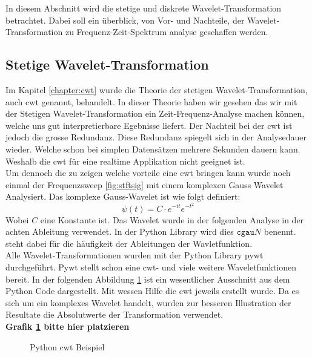 
In diesem Abschnitt wird die stetige und diskrete Wavelet-Transformation betrachtet. Dabei soll ein überblick, von Vor- und Nachteile, der Wavelet-Transformation zu Frequenz-Zeit-Spektrum analyse geschaffen werden. 



\subsection{Stetige Wavelet-Transformation} 
Im Kapitel \ref{chapter:cwt} wurde die Theorie der stetigen Wavelet-Transformation, auch cwt genannt, behandelt. In dieser Theorie haben wir gesehen das wir mit der Stetigen Wavelet-Transformation ein Zeit-Frequenz-Analyse machen können, welche uns gut interpretierbare Egebnisse liefert. Der Nachteil bei der cwt ist jedoch die grosse Redundanz. Diese Redundanz spiegelt sich in der Analysedauer wieder. Welche schon bei simplen Datensätzen mehrere Sekunden dauern kann. Weshalb die cwt für eine realtime Applikation nicht geeignet ist.\\
Um dennoch die zu zeigen welche vorteile eine cwt bringen kann wurde noch einmal der Frequenzsweep \ref{fig:stftsig} mit einem komplexen Gauss Wavelet Analysiert. Das komplexe Gauss-Wavelet ist wie folgt definiert:
\begin{equation}
\psi(t)=C \cdot e^{-it} e^{-t^{2}}
\label{eq:cgau}
\end{equation}
Wobei $C$ eine Konstante ist. Das Wavelet wurde in der folgenden Analyse in der achten Ableitung verwendet. In der Python Library wird dies $\texttt{cgau}N$ benennt. steht dabei für die häufigkeit der Ableitungen der Wavletfunktion.\\

Alle Wavelet-Transformationen wurden mit der Python Library pywt durchgeführt. Pywt stellt schon eine cwt- und viele weitere Waveletfunktionen bereit. In der folgenden Abbildung \ref{fig:python-cwt} ist ein wesentlicher Ausschnitt aus dem Python Code dargestellt. Mit wessen Hilfe die cwt jeweils erstellt wurde. Da es sich um ein komplexes Wavelet handelt, wurden zur besseren Illustration der Resultate die Absolutwerte der Transformation verwendet.\\
\color{red}\textbf{Grafik \ref{fig:python-cwt} bitte hier platzieren} \color{black} %

\begin{figure}[h]
	\centering
	
	\caption{Python cwt Beispiel}
	\label{fig:python-cwt}
\end{figure}

